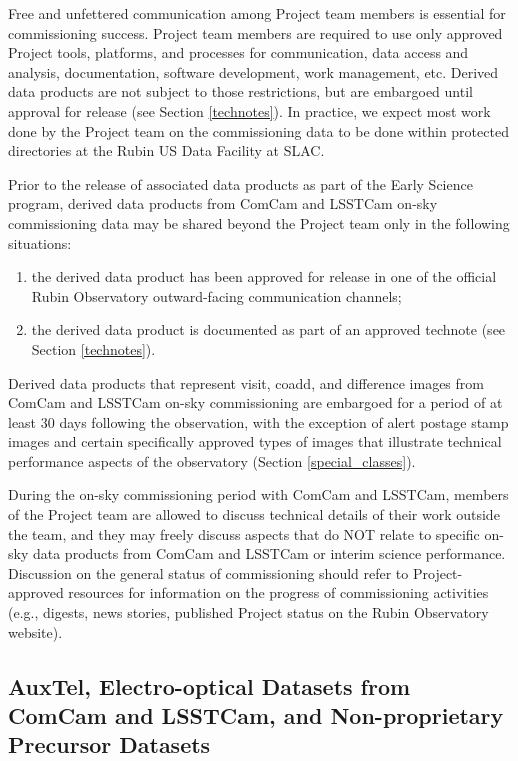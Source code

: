 \documentclass[SE,authoryear,toc]{lsstdoc}
\begin{document}
Free and unfettered communication among Project team members is essential for commissioning success.
Project team members are required to use only approved Project tools, platforms, and processes for communication, data access and analysis, documentation, software development, work management, etc.
Derived data products are not subject to those restrictions, but are embargoed until approval for release (see Section \ref{technotes}).
In practice, we expect most work done by the Project team on the commissioning data to be done within protected directories at the Rubin US Data Facility at SLAC.

Prior to the release of associated data products as part of the Early Science program, derived data products from ComCam and LSSTCam on-sky commissioning data may be shared beyond the Project team only in the following situations:

\begin{enumerate}

  \item the derived data product has been approved for release in one of the official Rubin Observatory outward-facing communication channels;

  \item the derived data product is documented as part of an approved technote (see Section \ref{technotes}).

\end{enumerate}

Derived data products that represent visit, coadd, and difference images from ComCam and LSSTCam on-sky commissioning are embargoed for a period of at least 30 days following the observation, with the exception of alert postage stamp images and certain specifically approved types of images that illustrate technical performance aspects of the observatory (Section \ref{special_classes}).

During the on-sky commissioning period with ComCam and LSSTCam, members of the Project team are allowed to discuss technical details of their work outside the team, and they may freely discuss aspects that do NOT relate to specific on-sky data products from ComCam and LSSTCam or interim science performance.
Discussion on the general status of commissioning should refer to Project-approved resources for information on the progress of commissioning activities (e.g., digests, news stories, published Project status on the Rubin Observatory website).

\subsection{AuxTel, Electro-optical Datasets from ComCam and LSSTCam, and Non-proprietary Precursor Datasets}
\end{document}
